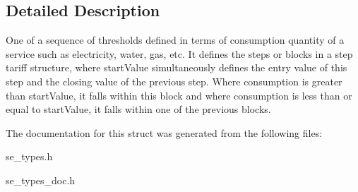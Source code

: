 \subsection{Detailed Description}
One of a sequence of thresholds defined in terms of consumption quantity of a service such as electricity, water, gas, etc. It defines the steps or blocks in a step tariff structure, where start\+Value simultaneously defines the entry value of this step and the closing value of the previous step. Where consumption is greater than start\+Value, it falls within this block and where consumption is less than or equal to start\+Value, it falls within one of the previous blocks. 

The documentation for this struct was generated from the following files\+:\begin{DoxyCompactItemize}
\item 
se\+\_\+types.\+h\item 
se\+\_\+types\+\_\+doc.\+h\end{DoxyCompactItemize}
